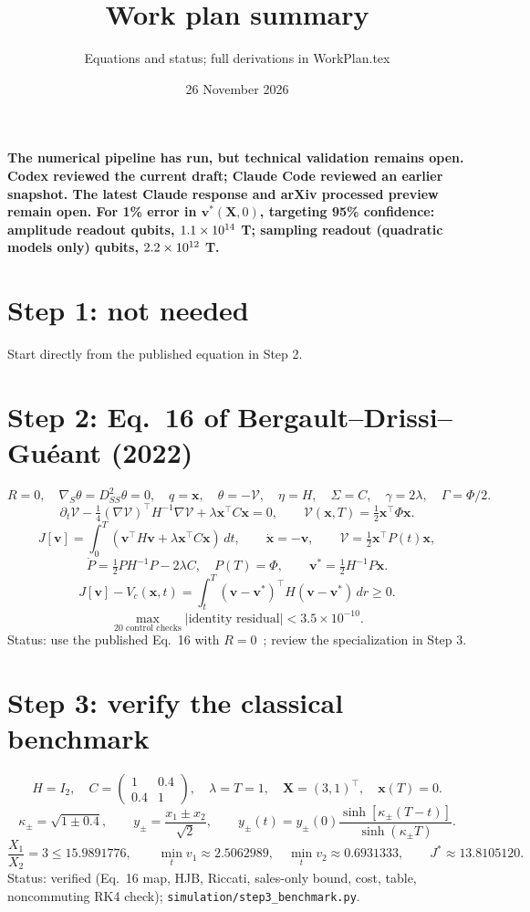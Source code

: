 \documentclass[11pt,a4paper]{article}
\title{\textbf{Work plan summary}}
\author{Equations and status; full derivations in WorkPlan.tex}
\date{26 November 2026}
\begin{document}
\maketitle

\textbf{The numerical pipeline has run, but technical validation remains open. Codex reviewed the current draft; Claude Code reviewed an earlier snapshot. The latest Claude response and arXiv processed preview remain open. For 1\% error in
$\mathbf v^*(\mathbf X,0)$, targeting 95\% confidence: amplitude readout \QAOne{} qubits,
$1.1\times10^{14}$ T; sampling readout (quadratic models only) \QBOne{} qubits,
$2.2\times10^{12}$ T.}

\section*{Step 1: not needed}
Start directly from the published equation in Step 2.

\section*{Step 2: Eq.~16 of Bergault--Drissi--Gu\'eant (2022)}
\[
 R=0,\quad \nabla_S\theta=D^2_{SS}\theta=0,\quad
 q=\mathbf x,\quad \theta=-\mathcal V,\quad
 \eta=H,\quad\Sigma=C,\quad\gamma=2\lambda,\quad\Gamma=\Phi/2.
\]
\[
 \boxed{\partial_t\mathcal V
 -\tfrac14(\nabla\mathcal V)^\top H^{-1}\nabla\mathcal V
 +\lambda\mathbf x^\top C\mathbf x=0,\qquad
 \mathcal V(\mathbf x,T)=\tfrac12\mathbf x^\top\Phi\mathbf x.}
\]
\[
 J[\mathbf v]=\int_0^T(\mathbf v^\top H\mathbf v+
 \lambda\mathbf x^\top C\mathbf x)\,dt,\qquad
 \dot{\mathbf x}=-\mathbf v,\qquad
 \mathcal V=\tfrac12\mathbf x^\top P(t)\mathbf x,
\]
\[
 \dot P=\tfrac12PH^{-1}P-2\lambda C,\quad P(T)=\Phi,
 \qquad \mathbf v^*=\tfrac12H^{-1}P\mathbf x.
\]
\[
 J[\mathbf v]-V_c(\mathbf x,t)=\int_t^T(\mathbf v-\mathbf v^*)^\top
 H(\mathbf v-\mathbf v^*)\,dr\ge0.
\]
\[
 \max_{\text{20 control checks}}|\text{identity residual}|<3.5\times10^{-10}.
\]
Status: use the published Eq.~16 with $R=0$~\cite{bdg}; review the specialization in Step 3.

\section*{Step 3: verify the classical benchmark}
\[
 H=I_2,\quad C=\begin{pmatrix}1&0.4\\0.4&1\end{pmatrix},\quad
 \lambda=T=1,\quad\mathbf X=(3,1)^\top,\quad\mathbf x(T)=0.
\]
\[
 \kappa_\pm=\sqrt{1\pm0.4},\qquad
 y_\pm=\frac{x_1\pm x_2}{\sqrt2},\qquad
 y_\pm(t)=y_\pm(0)\frac{\sinh[\kappa_\pm(T-t)]}{\sinh(\kappa_\pm T)}.
\]
\[
 \frac{X_1}{X_2}=3\le15.9891776,\qquad
 \min_t v_1\approx2.5062989,\quad\min_t v_2\approx0.6931333,
 \qquad J^*\approx13.8105120.
\]
Status: verified (Eq.~16 map, HJB, Riccati, sales-only bound, cost, table,
noncommuting RK4 check); \texttt{simulation/step3\_benchmark.py}.
\end{document}
